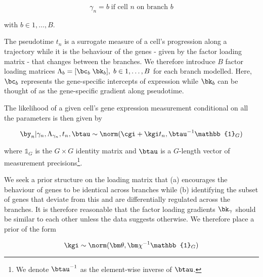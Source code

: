 \begin{equation}
\gamma_n = b \; \mbox{if cell $n$ on branch $b$}
\end{equation}

with $b \in 1,\ldots,B$.

The pseudotime $t_n$ is a surrogate measure of a cell's progression along a trajectory while it is the behaviour of the genes - given by the factor loading matrix - that changes between the branches. We therefore introduce $B$ factor loading matrices $\Lambda_b = [ \bc_b \; \bk_b], \; b \in 1, \ldots, B$ for each branch modelled. Here, $\bc_b$ represents the gene-specific intercepts of expression while $\bk_b$ can be thought of as the gene-specific gradient along pseudotime.


The likelihood of a given cell's gene expression measurement conditional on all the parameters is then given by %

\begin{equation}
\by_n | \gamma_n, \Lambda_{\gamma_n}, t_n, \btau  \sim \norm(\cgi + \kgi t_n, \btau^{-1} \mathbb{1}_G)
\end{equation}

where $\mathbb{1}_G$ is the $G \times G$ identity matrix and $\btau$ is a $G$-length vector of measurement precisions\footnote{We denote $\btau^{-1}$ as the element-wise inverse of $\btau$.}.

We seek a prior structure on the loading matrix that (a) encourages the behaviour of genes to be identical across branches while (b) identifying the subset of genes that deviate from this and are differentially regulated across the branches. It is therefore reasonable that the factor loading gradients $\bk_\gamma$ should be similar to each other unless the data suggests otherwise. We therefore place a prior of the form

\begin{equation}
\kgi \sim \norm(\bm \theta, \bm \chi^{-1} \mathbb{1}_G)
\end{equation}

